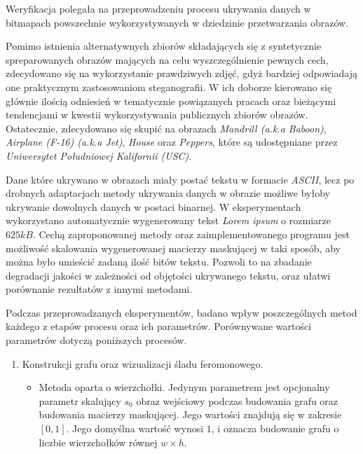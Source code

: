 {    %
    Weryfikacja polegała na przeprowadzeniu procesu ukrywania danych w bitmapach powszechnie wykorzystywanych w
    dziedzinie przetwarzania obrazów.

    Pomimo istnienia alternatywnych zbiorów składających się z syntetycznie spreparowanych obrazów mających na celu
    wyszczególnienie pewnych cech\cite{Uhlmann2018ACI}, zdecydowano się na wykorzystanie prawdziwych zdjęć, gdyż
    bardziej odpowiadają one praktycznym zastosowaniom steganografii. W ich doborze kierowano się głównie ilością
    odniesień w tematycznie powiązanych pracach oraz bieżącymi tendencjami w kwestii wykorzystywania publicznych zbiorów
    obrazów\cite{NoteOnLena1, NoteOnLena2}. Ostatecznie, zdecydowano się skupić na obrazach \textit{Mandrill (a.k.a
    Baboon)}, \textit{Airplane (F-16) (a.k.a Jet)}, \textit{House} oraz \textit{Peppers}, które są udostępniane przez
    \textit{Uniwersytet Południowej Kalifornii (USC)}\cite{USCDatabase}.

    Dane które ukrywano w obrazach miały postać tekstu w formacie \textit{ASCII}, lecz po drobnych adaptacjach metody
    ukrywania danych w obrazie możliwe byłoby ukrywanie dowolnych danych w postaci binarnej. W eksperymentach
    wykorzystano automatycznie wygenerowany tekst \textit{Lorem ipsum} o rozmiarze $625kB$. Cechą zaproponowanej metody
    oraz zaimplementowanego programu jest możliwość skalowania wygenerowanej macierzy maskującej w taki sposób, aby
    można było umieścić zadaną ilość bitów tekstu. Pozwoli to na zbadanie degradacji jakości w zależności od objętości
    ukrywanego tekstu, oraz ułatwi porównanie rezultatów z innymi metodami.

    Podczas przeprowadzanych eksperymentów, badano wpływ poszczególnych metod każdego z etapów procesu oraz ich
    parametrów. Porównywane wartości parametrów dotyczą poniższych procesów.

    \begin{enumerate}
        \item Konstrukcji grafu oraz wizualizacji śladu feromonowego.
        \begin{itemize}
            \item Metoda oparta o wierzchołki. Jedynym parametrem jest opcjonalny parametr skalujący $s_0$ obraz
            wejściowy podczas budowania grafu oraz budowania macierzy maskującej. Jego wartości znajdują się w zakresie
            $[0, 1]$. Jego domyślna wartość wynosi $1$, i oznacza budowanie grafu o liczbie wierzchołków równej $w
            \times h$.


\end{itemize}
\end{enumerate}}
